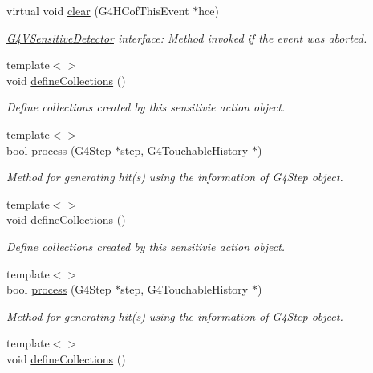 \begin{DoxyCompactItemize}
virtual void \hyperlink{class_d_d4hep_1_1_simulation_1_1_geant4_sensitive_action_a52a9e46a54f3e1605637dc281a878b0d}{clear} (G4\+H\+Cof\+This\+Event $\ast$hce)
\begin{DoxyCompactList}\small\item\em \hyperlink{class_g4_v_sensitive_detector}{G4\+V\+Sensitive\+Detector} interface\+: Method invoked if the event was aborted. \end{DoxyCompactList}\item 
{\footnotesize template$<$$>$ }\\void \hyperlink{class_d_d4hep_1_1_simulation_1_1_geant4_sensitive_action_a72dbf8f8489f717a74cf84c36c27b595}{define\+Collections} ()
\begin{DoxyCompactList}\small\item\em Define collections created by this sensitivie action object. \end{DoxyCompactList}\item 
{\footnotesize template$<$$>$ }\\bool \hyperlink{class_d_d4hep_1_1_simulation_1_1_geant4_sensitive_action_a2fa425bb9c1d9bc1276fcac2fd86984d}{process} (G4\+Step $\ast$step, G4\+Touchable\+History $\ast$)
\begin{DoxyCompactList}\small\item\em Method for generating hit(s) using the information of G4\+Step object. \end{DoxyCompactList}\item 
{\footnotesize template$<$$>$ }\\void \hyperlink{class_d_d4hep_1_1_simulation_1_1_geant4_sensitive_action_a87ec394277c9edd3eb91233c96d67d5e}{define\+Collections} ()
\begin{DoxyCompactList}\small\item\em Define collections created by this sensitivie action object. \end{DoxyCompactList}\item 
{\footnotesize template$<$$>$ }\\bool \hyperlink{class_d_d4hep_1_1_simulation_1_1_geant4_sensitive_action_ae88bc077d1d117f45a9952e2ca25e64f}{process} (G4\+Step $\ast$step, G4\+Touchable\+History $\ast$)
\begin{DoxyCompactList}\small\item\em Method for generating hit(s) using the information of G4\+Step object. \end{DoxyCompactList}\item 
{\footnotesize template$<$$>$ }\\void \hyperlink{class_d_d4hep_1_1_simulation_1_1_geant4_sensitive_action_abf6d5d9073398944a94a773e06df9594}{define\+Collections} ()

\end{DoxyCompactItemize}
